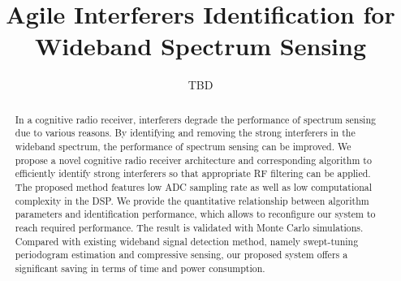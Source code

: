 \documentclass{IEEEtran}
\begin{document}
\title{Agile Interferers Identification for Wideband Spectrum Sensing}
\author{TBD}
\maketitle



\begin{abstract}
In a cognitive radio receiver, interferers degrade the performance of spectrum sensing due to various reasons. By identifying and removing the strong interferers in the wideband spectrum, the performance of spectrum sensing can be improved. We propose a novel cognitive radio receiver architecture and corresponding algorithm to efficiently identify strong interferers so that appropriate RF filtering can be applied. The proposed method features low ADC sampling rate as well as low computational complexity in the DSP. We provide the quantitative relationship between algorithm parameters and identification performance, which allows to reconfigure our system to reach required performance. The result is validated with Monte Carlo simulations. Compared with existing wideband signal detection method, namely swept-tuning periodogram estimation and compressive sensing, our proposed system offers a significant saving in terms of time and power consumption.
\end{abstract}

\IEEEpeerreviewmaketitle

\end{document}
